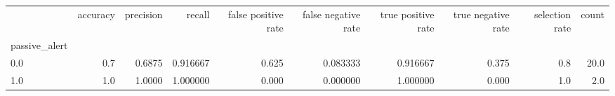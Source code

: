 \begin{tabular}{lrrrrrrrrr}
\toprule
{} &  accuracy &  precision &    recall &  false positive rate &  false negative rate &  true positive rate &  true negative rate &  selection rate &  count \\
passive\_alert &           &            &           &                      &                      &                     &                     &                 &        \\
\midrule
0.0           &       0.7 &     0.6875 &  0.916667 &                0.625 &             0.083333 &            0.916667 &               0.375 &             0.8 &   20.0 \\
1.0           &       1.0 &     1.0000 &  1.000000 &                0.000 &             0.000000 &            1.000000 &               0.000 &             1.0 &    2.0 \\
\bottomrule
\end{tabular}

